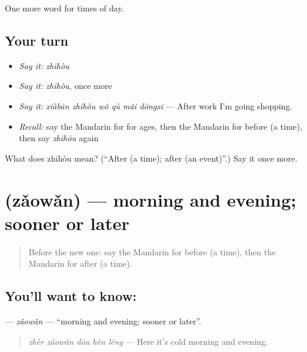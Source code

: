 \begin{grammarlens}[title={What you've built}]
One more word for times of day.
\end{grammarlens}

\subsection*{Your turn}
\begin{itemize}
\raggedright
  \item \emph{Say it:} \emph{zhīhòu}
  \item \emph{Say it:} \emph{zhīhòu}, once more
  \item \emph{Say it:} \emph{xiàbān zhīhòu wǒ qù mǎi dōngxi} — After work I'm going shopping.
  \item \emph{Recall:} say the Mandarin for for ages, then the Mandarin for before (a time), then say \emph{zhīhòu} again
\end{itemize}

\begin{tcolorbox}[breakable,colback=teal!4,colframe=teal!35!black,title={Before you move on}]
What does zhīhòu mean? (\textquotedblleft{}After (a time); after (an event)\textquotedblright{}.) Say it once more.
\end{tcolorbox}
\section[\texorpdfstring{\zh{早晚} (zǎowǎn)}{早晚 (zǎowǎn)}]{ (zǎowǎn) — morning and evening; sooner or later}

\label{lesson:ZH-C185-zaowan}



\begin{quote}
Before the new one: say the Mandarin for before (a time), then the Mandarin for after (a time).
\end{quote}

\subsection*{You'll want to know: }
\textbf{} — \emph{zǎowǎn} — \textquotedblleft{}morning and evening; sooner or later\textquotedblright{}.

\begin{quote}
\textbf{} \emph{zhèr zǎowǎn dōu hěn lěng} — Here it's cold morning and evening.
\end{quote}

